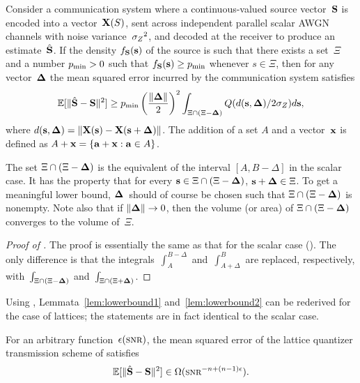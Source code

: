 \begin{lemma}
  \label{lem:zivboundvec}
  Consider a communication system where a continuous-valued source vector~$\S$
  is encoded into a vector~$\X(S)$, sent across independent parallel scalar AWGN
  channels with noise variance~$\szq$, and decoded at the receiver to produce
  an estimate~$\Shv$. If the density $f_{\S}(\s)$ of the source is such that
  there exists a set~$\Xi$ and a number $\pmin > 0$ such that $f_{\S}(\s) \ge
  \pmin$ whenever $s \in \Xi$, then for any vector~$\Dv$ the mean squared
  error incurred by the communication system satisfies
  \begin{equation*}
    \msev \ge \pmin  \left( \frac{\|\Dv\|}{2}\right)^2 \int_{\Xi \cap (\Xi -
    \Dv)} Q(d(\s, \Dv)/2 \sz) d\s,
  \end{equation*}
  where $d(\s,\Dv) = \|\X(\s) - \X(\s + \Dv)\|$. The addition of a set $A$ and a
  vector~$\x$ is defined as $A + \x = \{\vect{a} + \x : \vect{a} \in A\}$.
\end{lemma}

\begin{remark}
  \label{rem:zivboundvec}
  The set $\Xi \cap (\Xi - \Dv)$ is the equivalent of the interval $[A,
  B-\Delta]$ in the scalar case. It has the property that for every $\s \in \Xi
  \cap (\Xi - \Dv)$, $\s + \Dv \in \Xi$. To get a meaningful lower bound,
  $\Dv$~should of course be chosen such that $\Xi \cap (\Xi - \Dv)$ is nonempty.
  Note also that if $\|\Dv\| \goesto 0$, then the volume (or area) of $\Xi \cap
  (\Xi - \Dv)$ converges to the volume of~$\Xi$.
\end{remark}

\begin{proof}[Proof of ]
  The proof is essentially the same as that for the scalar case
  (). The only difference is that the
  integrals~$\int_A^{B-\Delta}$ and~$\int_{A+\Delta}^B$ are replaced,
  respectively, with~$\int_{\Xi \cap (\Xi - \Dv)}$ and~$\int_{\Xi \cap (\Xi +
  \Dv)}$.
\end{proof}

Using , Lemmata~\ref{lem:lowerbound1}
and~\ref{lem:lowerbound2} can be rederived for the case of lattices; the
statements are in fact identical to the scalar case.

\begin{lemma}
  \label{lem:lowerbound1vec}
  For an arbitrary function~$\e(\snr)$, the mean squared error of the lattice
  quantizer transmission scheme of  satisfies
  \begin{equation*}
    \msev \in \Omega(\snr^{-n + (n-1)\e}).
  \end{equation*}
\end{lemma}

